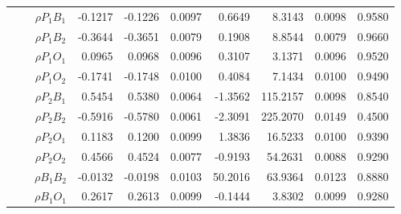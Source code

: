 \documentclass[letterpaper]{article}
\begin{document}
\begin{table}[h]
\begin{tabular}{cccrrrrrrr}
            &             & $\rho{P_1B_1}$ & -0.1217                & -0.1226                & 0.0097                 & 0.6649                 & 8.3143                 & 0.0098                   & 0.9580                 \\
            &             & $\rho{P_1B_2}$ & -0.3644                & -0.3651                & 0.0079                 & 0.1908                 & 8.8544                 & 0.0079                   & 0.9660                 \\
            &             & $\rho{P_1O_1}$ & 0.0965                 & 0.0968                 & 0.0096                 & 0.3107                 & 3.1371                 & 0.0096                   & 0.9520                 \\
            &             & $\rho{P_1O_2}$ & -0.1741                & -0.1748                & 0.0100                 & 0.4084                 & 7.1434                 & 0.0100                   & 0.9490                 \\
            &             & $\rho{P_2B_1}$ & 0.5454                 & 0.5380                 & 0.0064                 & -1.3562                & 115.2157               & 0.0098                   & 0.8540                 \\
            &             & $\rho{P_2B_2}$ & -0.5916                & -0.5780                & 0.0061                 & -2.3091                & 225.2070               & 0.0149                   & 0.4500                 \\
            &             & $\rho{P_2O_1}$ & 0.1183                 & 0.1200                 & 0.0099                 & 1.3836                 & 16.5233                & 0.0100                   & 0.9390                 \\
            &             & $\rho{P_2O_2}$ & 0.4566                 & 0.4524                 & 0.0077                 & -0.9193                & 54.2631                & 0.0088                   & 0.9290                 \\
            &             & $\rho{B_1B_2}$ & -0.0132                & -0.0198                & 0.0103                 & 50.2016                & 63.9364                & 0.0123                   & 0.8880                 \\
            &             & $\rho{B_1O_1}$ & 0.2617                 & 0.2613                 & 0.0099                 & -0.1444                & 3.8302                 & 0.0099                   & 0.9280                 \\

\end{tabular}
\end{table}
\end{document}
